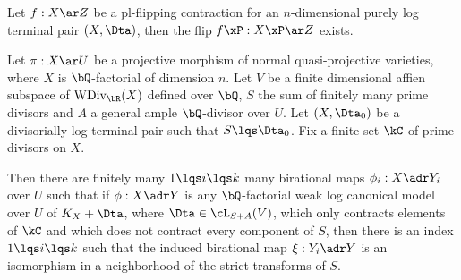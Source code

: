 \documentclass[article, a4paper, twoside]{universal}
\begin{document}
\begin{thm}[$A_{n}$]
	Let $f:X\ar Z$ be a pl-flipping contraction for an $n$-dimensional purely log terminal pair $(X,\Dta)$, then the flip $f\xP:X\xP\ar Z$ exists.
\end{thm}

\begin{thm}[$B_{n}$]
	Let $\pi:X\ar U$ be a projective morphism of normal quasi-projective varieties, where $X$ is $\bQ$-factorial of dimension $n$. Let $V$ be a finite dimensional affien subspace of $\mathrm{WDiv}_{\bR}(X)$ defined over $\bQ$, $S$ the sum of finitely many prime divisors and $A$ a general ample $\bQ$-divisor over $U$. Let $(X,\Dta_{0})$ be a divisorially log terminal pair such that $S\lqs\Dta_{0}$. Fix a finite set $\kC$ of prime divisors on $X$.

	Then there are finitely many $1\lqs i\lqs k$ many birational maps $\phi_{i}:X\adr Y_{i}$ over $U$ such that if $\phi:X\adr Y$ is any $\bQ$-factorial weak log canonical model over $U$ of $K_{X}+\Dta$, where $\Dta\in\cL_{S+A}(V)$, which only contracts elements of $\kC$ and which does not contract every component of $S$, then there is an index $1\lqs i\lqs k$ such that the induced birational map $\xi:Y_{i}\adr Y$ is an isomorphism in a neighborhood of the strict transforms of $S$.
\end{thm}

\printref
\end{document}
